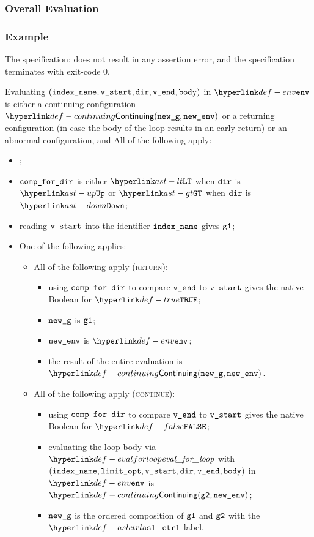 \subsubsection{Overall Evaluation}
\subsubsection{Example}
The specification:
does not result in any assertion error, and the specification terminates with exit-code $0$.

Evaluating $(\texttt{index\_name}, \texttt{v\_start}, \texttt{dir}, \texttt{v\_end}, \texttt{body})$ in $\env$ is either
a continuing configuration $\Continuing(\newg, \newenv)$ or a returning configuration
(in case the body of the loop results in an early return)
or an abnormal configuration,
and All of the following apply:
\begin{itemize}
  \item \Proseticklooplimit{$\vlimitopt$}{$\vnextlimitopt$}\ProseOrError;
  \item $\texttt{comp\_for\_dir}$ is either $\LT$ when $\texttt{dir}$ is $\UP$ or $\GT$ when $\texttt{dir}$ is $\DOWN$;
  \item reading $\texttt{v\_start}$ into the identifier $\texttt{index\_name}$ gives $\texttt{g1}$;
  \item One of the following applies:
    \begin{itemize}
    \item All of the following apply (\textsc{return}):
    \begin{itemize}
      \item using $\texttt{comp\_for\_dir}$ to compare $\texttt{v\_end}$ to $\texttt{v\_start}$ gives the native Boolean for $\True$;
      \item $\texttt{new\_g}$ is $\texttt{g1}$;
      \item $\texttt{new\_env}$ is $\env$;
      \item the result of the entire evaluation is $\Continuing(\newg, \newenv)$.
    \end{itemize}
    \item All of the following apply (\textsc{continue}):
    \begin{itemize}
      \item using $\texttt{comp\_for\_dir}$ to compare $\texttt{v\_end}$ to $\texttt{v\_start}$ gives the native Boolean for $\False$;
      \item evaluating the loop body via $\evalforloop$ with \\ $(\texttt{index\_name}, \texttt{limit\_opt}, \texttt{v\_start}, \texttt{dir}, \texttt{v\_end}, \texttt{body})$
      in $\env$ is \\ $\Continuing(\vgtwo, \newenv)$\ProseTerminateAs{\ReturningConfig, \ThrowingConfig, \DynErrorConfig};
      \item $\texttt{new\_g}$ is the ordered composition of $\texttt{g1}$ and $\texttt{g2}$ with the $\aslctrl$ label.
    \end{itemize}
  \end{itemize}
\end{itemize}

